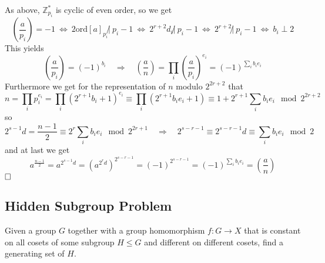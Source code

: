 \documentclass{scrartcl}
\newcommand{\Z}{\mathbb{Z}}
\begin{document}
As above, $\Z_{p_i}^*$ is cyclic of even order, so we get
\begin{equation*}
    \left(\frac a {p_i}\right) = -1 \ \Leftrightarrow \ 2 \mathrm{ord}[a]_{p_i} \not| \ p_i - 1 \ \Leftrightarrow \ 2^{r + 2}d_i \not| \ p_i - 1  \ \Leftrightarrow \ 2^{r + 2} \not| \ p_i - 1 \ \Leftrightarrow \ b_i \perp 2
\end{equation*}
This yields
\begin{equation*}
    \left(\frac a {p_i}\right) = (-1)^{b_i} \quad \Rightarrow \quad \left(\frac a n\right) = \prod_i \left(\frac a {p_i}\right)^{e_i} = (-1)^{\sum_i b_i e_i}
\end{equation*}
Furthermore we get for the representation of $n$ modulo $2^{2r + 2}$ that
\begin{equation*}
    n = \prod_i p_i^{e_i} = \prod_i (2^{r + 1} b_i + 1)^{e_i} \equiv \prod_i (2^{r + 1} b_i e_i + 1) \equiv 1 + 2^{r + 1} \sum_i b_i e_i \mod 2^{2r + 2}
\end{equation*}
so
\begin{equation*}
    2^{s - 1}d = \frac {n - 1} 2 \equiv 2^r \sum_i b_i e_i \mod 2^{2r + 1} \quad \Rightarrow \quad 2^{s - r - 1} \equiv 2^{s - r - 1}d \equiv \sum_i b_i e_i \mod 2
\end{equation*}
and at last we get
\begin{equation*}
    a^{\frac {n - 1} 2} = a^{2^{s - 1}d} = \left( a^{2^rd} \right)^{2^{s - r - 1}} = (-1)^{2^{s - r - 1}} = (-1)^{\sum_i b_i e_i} = \left(\frac a n\right)
\end{equation*}
$\hfill\square$

\subsection{Hidden Subgroup Problem}
Given a group $G$ together with a group homomorphism $f: G \to X$ that is constant on all cosets of some subgroup $H \leq G$ and different on different cosets, find a generating set of $H$.
\end{document}
